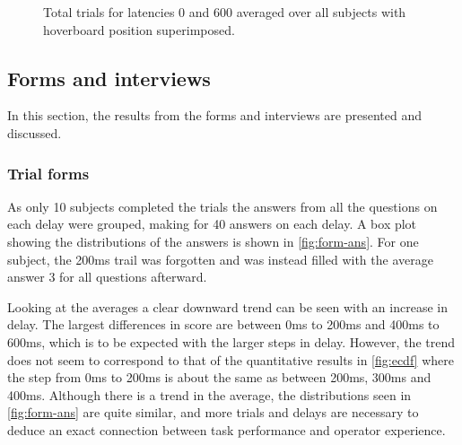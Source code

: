 \documentclass[nofilelist]{cslthse-msc}
\begin{document}
\begin{figure}[!hbt]
   \centering
   \caption{Total trials for latencies 0 and 600 averaged over all subjects with hoverboard position superimposed.}
   \label{fig:0vs600}
\end{figure}


\subsection{Forms and interviews}
In this section, the results from the forms and interviews are presented and discussed.

\subsubsection{Trial forms}
As only 10 subjects completed the trials the answers from all the questions on each delay were grouped, making for 40 answers on each delay. A box plot showing the distributions of the answers is shown in \ref{fig:form-ans}. For one subject, the 200ms trail was forgotten and was instead filled with the average answer 3 for all questions afterward.

Looking at the averages a clear downward trend can be seen with an increase in delay. The largest differences in score are between 0ms to 200ms and 400ms to 600ms, which is to be expected with the larger steps in delay. However, the trend does not seem to correspond to that of the quantitative results in \ref{fig:ecdf} where the step from 0ms to 200ms is about the same as between 200ms, 300ms and 400ms. Although there is a trend in the average, the distributions seen in \ref{fig:form-ans} are quite similar, and more trials and delays are necessary to deduce an exact connection between task performance and operator experience.   
\end{document}
